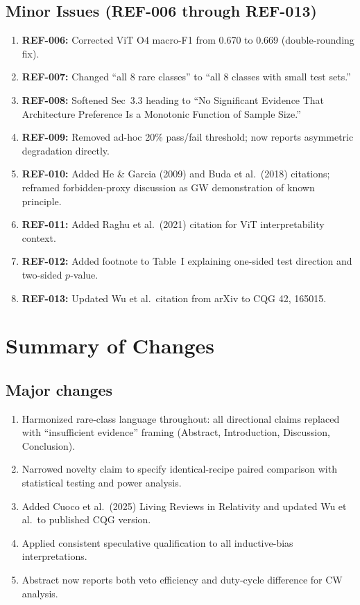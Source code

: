 \documentclass[12pt]{article}
\begin{document}
\subsection*{Minor Issues (REF-006 through REF-013)}

\begin{enumerate}
  \item[6.] \textbf{REF-006:} Corrected ViT O4 macro-F1 from 0.670 to 0.669 (double-rounding fix).
  \item[7.] \textbf{REF-007:} Changed ``all 8 rare classes'' to ``all 8 classes with small test sets.''
  \item[8.] \textbf{REF-008:} Softened Sec~3.3 heading to ``No Significant Evidence That Architecture Preference Is a Monotonic Function of Sample Size.''
  \item[9.] \textbf{REF-009:} Removed ad-hoc 20\% pass/fail threshold; now reports asymmetric degradation directly.
  \item[10.] \textbf{REF-010:} Added He \& Garcia (2009) and Buda et al.\ (2018) citations; reframed forbidden-proxy discussion as GW demonstration of known principle.
  \item[11.] \textbf{REF-011:} Added Raghu et al.\ (2021) citation for ViT interpretability context.
  \item[12.] \textbf{REF-012:} Added footnote to Table~I explaining one-sided test direction and two-sided $p$-value.
  \item[13.] \textbf{REF-013:} Updated Wu et al.\ citation from arXiv to CQG 42, 165015.
\end{enumerate}

\section*{Summary of Changes}

\subsection*{Major changes}
\begin{enumerate}
  \item Harmonized rare-class language throughout: all directional claims replaced with ``insufficient evidence'' framing (Abstract, Introduction, Discussion, Conclusion).
  \item Narrowed novelty claim to specify identical-recipe paired comparison with statistical testing and power analysis.
  \item Added Cuoco et al.\ (2025) Living Reviews in Relativity and updated Wu et al.\ to published CQG version.
  \item Applied consistent speculative qualification to all inductive-bias interpretations.
  \item Abstract now reports both veto efficiency and duty-cycle difference for CW analysis.
\end{enumerate}
\end{document}
